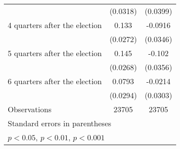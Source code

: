 \begin{table}[htbp]
\begin{tabular}{l*{2}{c}}
                    &    (0.0318)         &    (0.0399)         \\
[1em]
 4 quarters after the election&       0.133\sym{***}&     -0.0916\sym{**} \\
                    &    (0.0272)         &    (0.0346)         \\
[1em]
 5 quarters after the election&       0.145\sym{***}&      -0.102\sym{**} \\
                    &    (0.0268)         &    (0.0356)         \\
[1em]
 6 quarters after the election&      0.0793\sym{**} &     -0.0214         \\
                    &    (0.0294)         &    (0.0303)         \\
\hline
Observations        &       23705         &       23705         \\
\hline\hline
\multicolumn{3}{l}{\footnotesize Standard errors in parentheses}\\
\multicolumn{3}{l}{\footnotesize \sym{*} \(p<0.05\), \sym{**} \(p<0.01\), \sym{***} \(p<0.001\)}\\
\end{tabular}
\end{table}

